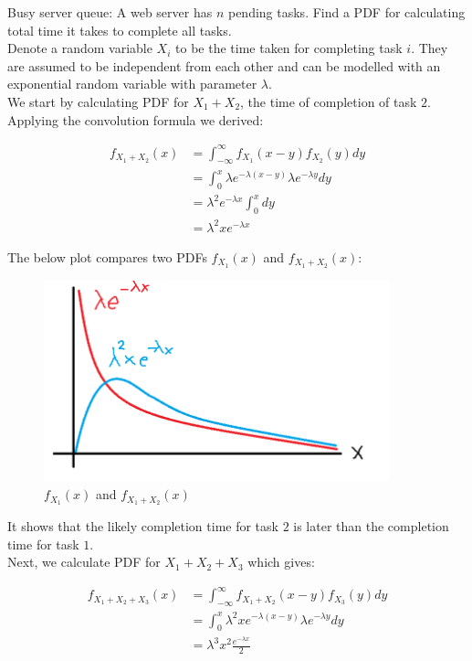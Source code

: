 \documentclass[12pt, a4paper]{article}
\newcounter{exa}
\begin{document}
\begin{texample}
Busy server queue: A web server has $n$ pending tasks. Find a PDF for calculating total time it takes to complete all tasks. \\

Denote a random variable $X_i$ to be the time taken for completing task $i$. They are assumed to be independent from each other and can be modelled with an exponential random variable with parameter $\lambda$. \\

We start by calculating PDF for $X_1+X_2$, the time of completion of task $2$. Applying the convolution formula we derived:

\begin{align*}
f_{X_1+X_2}(x)&=\int_{-\infty}^\infty f_{X_1}(x-y) f_{X_2}(y) dy \\
&=\int_0^x \lambda e^{-\lambda (x-y)} \lambda e^{-\lambda y} dy \\
&=\lambda^2 e^{-\lambda x} \int_0^x dy \\
&=\lambda^2 xe^{-\lambda x}
\end{align*}

The below plot compares two PDFs $f_{X_1}(x)$ and $f_{X_1+X_2}(x)$:

\begin{figure}[H]
\centering
\includegraphics[width=100mm]{29.png}
\caption{$f_{X_1}(x)$ and $f_{X_1+X_2}(x)$}
\end{figure}

It shows that the likely completion time for task $2$ is later than the completion time for task $1$. \\

Next, we calculate PDF for $X_1+X_2+X_3$ which gives:

\begin{align*}
f_{X_1+X_2+X_3}(x)&=\int_{-\infty}^\infty f_{X_1+X_2}(x-y) f_{X_3}(y) dy \\
&=\int_0^x \lambda^2 xe^{-\lambda (x-y)} \lambda e^{-\lambda y} dy \\
&=\lambda^3 x^2\frac{e^{-\lambda x}}{2}
\end{align*}


\end{texample}
\end{document}
